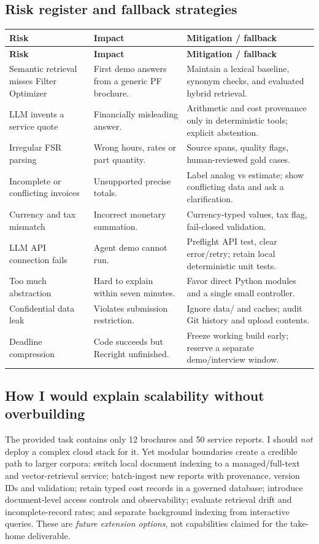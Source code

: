 \documentclass[11pt,a4paper]{article}
\begin{document}
\subsection{Risk register and fallback strategies}
\begin{longtable}{@{}L{34mm}L{65mm}L{48mm}@{}}
\toprule\textbf{Risk} & \textbf{Impact} & \textbf{Mitigation / fallback}\\\midrule\endfirsthead
\toprule\textbf{Risk} & \textbf{Impact} & \textbf{Mitigation / fallback}\\\midrule\endhead
Semantic retrieval misses Filter Optimizer & First demo answers from a generic PF brochure. & Maintain a lexical baseline, synonym checks, and evaluated hybrid retrieval.\\
LLM invents a service quote & Financially misleading answer. & Arithmetic and cost provenance only in deterministic tools; explicit abstention.\\
Irregular FSR parsing & Wrong hours, rates or part quantity. & Source spans, quality flags, human-reviewed gold cases.\\
Incomplete or conflicting invoices & Unsupported precise totals. & Label analog vs estimate; show conflicting data and ask a clarification.\\
Currency and tax mismatch & Incorrect monetary summation. & Currency-typed values, tax flag, fail-closed validation.\\
LLM API connection fails & Agent demo cannot run. & Preflight API test, clear error/retry; retain local deterministic unit tests.\\
Too much abstraction & Hard to explain within seven minutes. & Favor direct Python modules and a single small controller.\\
Confidential data leak & Violates submission restriction. & Ignore data/ and caches; audit Git history and upload contents.\\
Deadline compression & Code succeeds but Recright unfinished. & Freeze working build early; reserve a separate demo/interview window.\\
\bottomrule
\end{longtable}

\subsection{How I would explain scalability without overbuilding}
The provided task contains only 12 brochures and 50 service reports. I should \emph{not} deploy a complex cloud stack for it. Yet modular boundaries create a credible path to larger corpora: switch local document indexing to a managed/full-text and vector-retrieval service; batch-ingest new reports with provenance, version IDs and validation; retain typed cost records in a governed database; introduce document-level access controls and observability; evaluate retrieval drift and incomplete-record rates; and separate background indexing from interactive queries. These are \emph{future extension options}, not capabilities claimed for the take-home deliverable.
\end{document}

